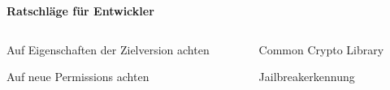 \begin{frame}
	\centering
	\textbf{Ratschläge für Entwickler}
	
	\begin{columns}[T] %
    	
    	\begin{column}[T]{5cm} %
    		\begin{block}{}
				Auf Eigenschaften der Zielversion achten
			\end{block}
			\begin{block}{}
				Auf neue Permissions achten
			\end{block}
    	\end{column}
    	
    	\begin{column}[T]{5cm} %
    		\begin{block}{}
				Common Crypto Library
			\end{block}
			\begin{block}{}
				Jailbreakerkennung
			\end{block}
    	\end{column}	
    	
    \end{columns}
\end{frame}